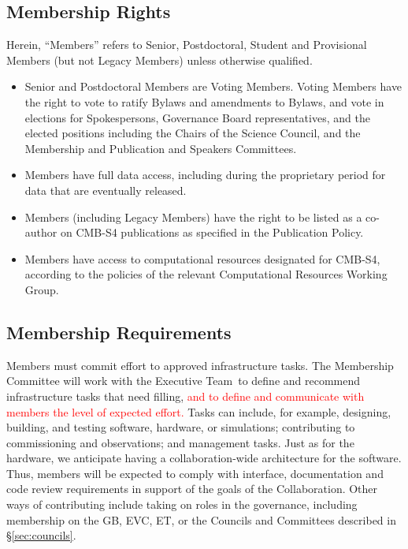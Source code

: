 \documentclass[12pt]{article}
\newcommand{\exec}{{Executive Team}}
\begin{document}
\subsection{Membership Rights}\label{sec:memberrights}

Herein, ``Members'' refers to Senior, Postdoctoral, Student and Provisional Members (but not Legacy Members) unless otherwise qualified.  

\begin{itemize}

\item Senior and Postdoctoral Members are Voting Members.  Voting Members  have the right to vote to ratify Bylaws and amendments to Bylaws, and vote in elections for Spokespersons, Governance Board representatives, and the elected positions including the Chairs of the Science Council, and the Membership and Publication and Speakers Committees.  %

\item Members have full data access, including during the proprietary period for data that are eventually released.

\item Members (including Legacy Members) have the right to be listed as a co-author on CMB-S4 publications as specified in the Publication Policy.

\item Members have access to computational resources designated for CMB-S4, according to the policies of the relevant Computational Resources Working Group.

\end{itemize}

\subsection{Membership Requirements}

 Members must commit effort to approved infrastructure tasks.   
The Membership Committee will work with the \exec\ to define and recommend infrastructure tasks that need filling, 
\textcolor{red}{ and to define and communicate with members the level of expected effort.}
Tasks can include,  for example, designing, building, and testing software, hardware, or simulations; contributing to commissioning and observations; and management tasks. 
Just as for the hardware, we anticipate having a collaboration-wide architecture for the software.  Thus, members will be expected to comply with interface, documentation and code review requirements in support of the goals of the Collaboration.   Other ways of contributing include taking on roles in the governance, including membership on the GB, EVC, ET, or the Councils and Committees described in \S\ref{sec:councils}.
\end{document}
